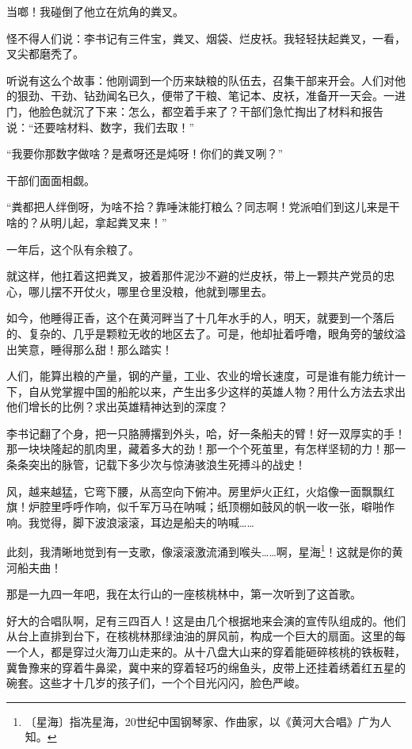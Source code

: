 \documentclass[12pt,UTF-8,openany]{ctexbook}
\begin{document}
\begin{large}
    当啷！我碰倒了他立在炕角的粪叉。
    
    怪不得人们说：李书记有三件宝，粪叉、烟袋、烂皮袄。我轻轻扶起粪叉，一看，叉尖都磨秃了。
    
    听说有这么个故事：他刚调到一个历来缺粮的队伍去，召集干部来开会。人们对他的狠劲、干劲、钻劲闻名已久，便带了干粮、笔记本、皮袄，准备开一天会。一进门，他脸色就沉了下来：怎么，都空着手来了？干部们急忙掏出了材料和报告说：“还要啥材料、数字，我们去取！”
    
    “我要你那数字做啥？是煮呀还是炖呀！你们的粪叉咧？”
    
    干部们面面相觑。
    
    “粪都把人绊倒呀，为啥不拾？靠唾沫能打粮么？同志啊！党派咱们到这儿来是干啥的？从明儿起，拿起粪叉来！”
    
    一年后，这个队有余粮了。
    
    就这样，他扛着这把粪叉，披着那件泥沙不避的烂皮袄，带上一颗共产党员的忠心，哪儿摆不开仗火，哪里仓里没粮，他就到哪里去。
    
    如今，他睡得正香，这个在黄河畔当了十几年水手的人，明天，就要到一个落后的、复杂的、几乎是颗粒无收的地区去了。可是，他却扯着呼噜，眼角旁的皱纹溢出笑意，睡得那么甜！那么踏实！
    
    人们，能算出粮的产量，钢的产量，工业、农业的增长速度，可是谁有能力统计一下，自从党掌握中国的船舵以来，产生出多少这样的英雄人物？用什么方法去求出他们增长的比例？求出英雄精神达到的深度？
    
    李书记翻了个身，把一只胳膊撂到外头，哈，好一条船夫的臂！好一双厚实的手！那一块块隆起的肌肉里，藏着多大的劲！那一个个死茧里，有怎样坚韧的力！那一条条突出的脉管，记载下多少次与惊涛骇浪生死搏斗的战史！
    
    风，越来越猛，它弯下腰，从高空向下俯冲。房里炉火正红，火焰像一面飘飘红旗！炉腔里呼呼作响，似千军万马在呐喊；纸顶棚如鼓风的帆一收一张，噼啪作响。我觉得，脚下波浪滚滚，耳边是船夫的呐喊……
    
    此刻，我清晰地觉到有一支歌，像滚滚激流涌到喉头……啊，星海\footnote{〔星海〕指冼星海，20世纪中国钢琴家、作曲家，以《黄河大合唱》广为人知。}！这就是你的黄河船夫曲！
    
    那是一九四一年吧，我在太行山的一座核桃林中，第一次听到了这首歌。
    
    好大的合唱队啊，足有三四百人！这是由几个根据地来会演的宣传队组成的。他们从台上直排到台下，在核桃林那绿油油的屏风前，构成一个巨大的扇面。这里的每一个人，都是穿过火海刀山走来的。从十八盘大山来的穿着能砸碎核桃的铁板鞋，冀鲁豫来的穿着牛鼻梁，冀中来的穿着轻巧的绵鱼头，皮带上还挂着绣着红五星的碗套。这些才十几岁的孩子们，一个个目光闪闪，脸色严峻。
    

\end{large}
\end{document}

